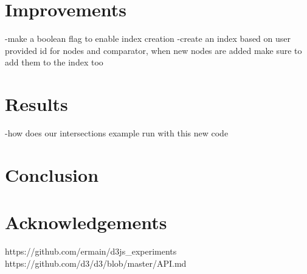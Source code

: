 \documentclass[a4paper]{article}
\begin{document}
\section{Improvements}
-make a boolean flag to enable index creation
-create an index based on user provided id for nodes and comparator, when new nodes are added make sure to add them to the index too
\section{Results}
-how does our intersections example run with this new code
\section{Conclusion}

\section{Acknowledgements}


\begin{thebibliography}{9}
 https://github.com/ermain/d3js\_experiments
 https://github.com/d3/d3/blob/master/API.md
\end{thebibliography}

\end{document}
